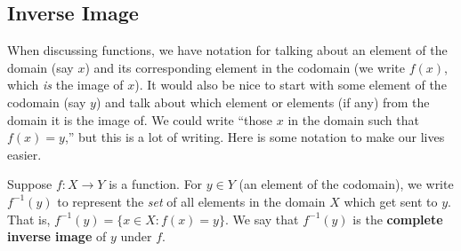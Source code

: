 \documentclass[10pt,]{book}
\newcommand{\terminology}[1]{\textbf{#1}}
\theoremstyle{plain}
\theoremstyle{definition}
\theoremstyle{definition}
\theoremstyle{definition}
\numberwithin{equation}{chapter}
\def\inv{^{-1}}
\def\st{:}
\begin{document}
\subsection[Inverse Image]{Inverse Image}\label{subsection-9}

      When discussing functions, we have notation for talking about an element of the domain (say \(x\)) and its corresponding element in the codomain (we write \(f(x)\), which \emph{is} the image of \(x\)). It would also be nice to start with some element of the codomain (say \(y\)) and talk about which element or elements (if any) from the domain it is the image of. We could write ``those \(x\) in the domain such that \(f(x) = y\),'' but this is a lot of writing. Here is some notation to make our lives easier.
\par

      Suppose \(f:X \to Y\) is a function. For \(y \in Y\) (an element of the codomain), we write
      \(f\inv(y)\)\label{notation-4}
 to represent the \emph{set} of all elements in the domain \(X\) which get sent to \(y\). That is, \(f\inv(y) = \{x \in X \st f(x) = y\}\). We say that \(f\inv(y)\) is the
      \terminology{complete inverse image} of \(y\) under \(f\).
\par
\end{document}
